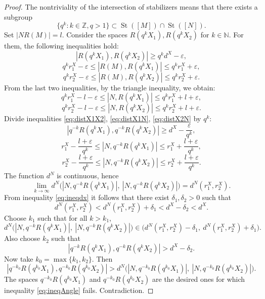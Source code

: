 \begin{proof}
  The nontriviality of the intersection of stabilizers means
  that there exists a subgroup
  \[
    \{q^k : k \in \mathbb{Z}, q > 1\} \subset \operatorname{St}([M])
    \cap \operatorname{St}([N]).
  \]
  Set \(|N R(M)| = l\). Consider the spaces \(R(q^k X_1), R(q^k
  X_2)\) for \(k \in \mathbb{N}\). For them, the following inequalities hold:
  \begin{equation}
    |R(q^k X_1), R(q^k X_2)| \ge q^k d^X - \varepsilon, \label{eq:distX1X2}
  \end{equation}
  \[
    q^k r_1^X - \varepsilon \le |R(M), R(q^k X_1)| \le q^k r_1^X + \varepsilon,
  \]
  \[
    q^k r_2^X - \varepsilon \le |R(M), R(q^k X_2)| \le q^k r_2^X + \varepsilon.
  \]
  From the last two inequalities, by the triangle inequality, we obtain:
  \begin{equation}
    q^k r_1^X - l - \varepsilon \le |N, R(q^k X_1)| \le q^k r_1^X + l
    + \varepsilon, \label{eq:distX1N}
  \end{equation}
  \begin{equation}
    q^k r_2^X - l - \varepsilon \le |N, R(q^k X_2)| \le q^k r_2^X + l
    + \varepsilon. \label{eq:distX2N}
  \end{equation}
  Divide inequalities \eqref{eq:distX1X2}, \eqref{eq:distX1N},
  \eqref{eq:distX2N} by \(q^k\):
  \[
    |q^{-k} R(q^k X_1), q^{-k} R(q^k X_2)| \ge d^X - \frac{\varepsilon}{q^k},
  \]
  \[
    r_1^X - \frac{l+\varepsilon}{q^k} \le |N, q^{-k} R(q^k X_1)| \le
    r_1^X + \frac{l+\varepsilon}{q^k},
  \]
  \[
    r_2^X - \frac{l+\varepsilon}{q^k} \le |N, q^{-k} R(q^k X_2)| \le
    r_2^X + \frac{l+\varepsilon}{q^k}.
  \]
  The function \(d^N\) is continuous, hence
  \[
    \lim_{k \to \infty} d^N\!\bigl(|N, q^{-k} R(q^k X_1)|,\ |N,
    q^{-k} R(q^k X_2)|\bigr) = d^N(r_1^X, r_2^X).
  \]
  From inequality \eqref{eq:ineqdx} it follows that there exist
  \(\delta_1, \delta_2 > 0\) such that
  \[
    d^N(r_1^X, r_2^X) < d^N(r_1^X, r_2^X) + \delta_1 < d^X - \delta_2 < d^X.
  \]
  Choose \(k_1\) such that for all \(k > k_1\),
  \[
    d^N\!\bigl(|N, q^{-k} R(q^k X_1)|,\ |N, q^{-k} R(q^k X_2)|\bigr)
    \in \bigl(d^N(r_1^X, r_2^X) - \delta_1,\ d^N(r_1^X, r_2^X) + \delta_1\bigr).
  \]
  Also choose \(k_2\) such that
  \[
    |q^{-k} R(q^k X_1), q^{-k} R(q^k X_2)| > d^X - \delta_2.
  \]
  Now take \(k_0 = \max\{k_1, k_2\}\). Then
  \[
    |q^{-k_0} R(q^{k_0} X_1), q^{-k_0} R(q^{k_0} X_2)|
    >
    d^N\!\bigl(|N, q^{-k_0} R(q^{k_0} X_1)|,\ |N, q^{-k_0} R(q^{k_0}
    X_2)|\bigr).
  \]
  The spaces \(q^{-k_0} R(q^{k_0} X_1)\) and \(q^{-k_0} R(q^{k_0}
  X_2)\) are the desired ones for which inequality
  \eqref{eq:ineqAngle} fails. Contradiction.
\end{proof}

